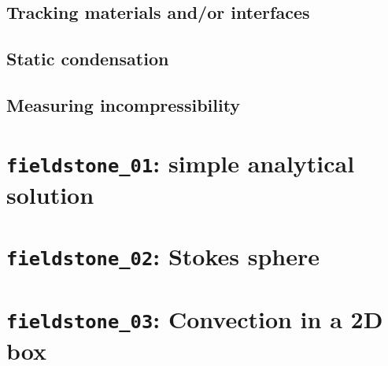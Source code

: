 \documentclass[a4paper]{article}
\begin{document}
\subsection{Tracking materials and/or interfaces}  %
\newpage %
\subsection{Static condensation}  %
\newpage %
\subsection{Measuring incompressibility \label{ss_incomp}}  %



\newpage %
\section{{\tt fieldstone\_01}: simple analytical solution \label{f01}} %

\newpage %
\section{{\tt fieldstone\_02}: Stokes sphere \label{f02}} %

\newpage %
\section{{\tt fieldstone\_03}: Convection in a 2D box \label{f03}} %

\newpage %
\end{document}
